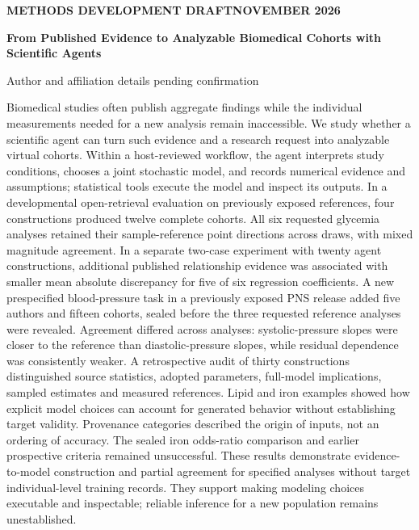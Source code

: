 \documentclass[11pt,letterpaper]{article}
\renewenvironment{abstract}{\small\par\noindent{\sffamily\bfseries\color{ink}Abstract}\quad\ignorespaces}{\par\medskip}
\begin{document}
\thispagestyle{plain}
{\sffamily\footnotesize\color{accent}\bfseries METHODS DEVELOPMENT DRAFT\quad\textbar\quad NOVEMBER 2026\par}
\vspace{.7em}
{\raggedright\sffamily\bfseries\fontsize{24}{29}\selectfont\color{ink}From Published Evidence to Analyzable Biomedical Cohorts with Scientific Agents\par}
\vspace{.5em}
{\small Author and affiliation details pending confirmation\par}
\vspace{.7em}
\begin{abstract}

Biomedical studies often publish aggregate findings while the individual measurements needed for a new analysis remain inaccessible. We study whether a scientific agent can turn such evidence and a research request into analyzable virtual cohorts. Within a host-reviewed workflow, the agent interprets study conditions, chooses a joint stochastic model, and records numerical evidence and assumptions; statistical tools execute the model and inspect its outputs. In a developmental open-retrieval evaluation on previously exposed references, four constructions produced twelve complete cohorts. All six requested glycemia analyses retained their sample-reference point directions across draws, with mixed magnitude agreement. In a separate two-case experiment with twenty agent constructions, additional published relationship evidence was associated with smaller mean absolute discrepancy for five of six regression coefficients. A new prespecified blood-pressure task in a previously exposed PNS release added five authors and fifteen cohorts, sealed before the three requested reference analyses were revealed. Agreement differed across analyses: systolic-pressure slopes were closer to the reference than diastolic-pressure slopes, while residual dependence was consistently weaker. A retrospective audit of thirty constructions distinguished source statistics, adopted parameters, full-model implications, sampled estimates and measured references. Lipid and iron examples showed how explicit model choices can account for generated behavior without establishing target validity. Provenance categories described the origin of inputs, not an ordering of accuracy. The sealed iron odds-ratio comparison and earlier prospective criteria remained unsuccessful. These results demonstrate evidence-to-model construction and partial agreement for specified analyses without target individual-level training records. They support making modeling choices executable and inspectable; reliable inference for a new population remains unestablished.

\end{abstract}
\end{document}
